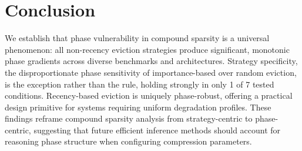 \documentclass[11pt,a4paper]{article}
\begin{document}
\section{Conclusion}

We establish that phase vulnerability in compound sparsity is a universal phenomenon: all non-recency eviction strategies produce significant, monotonic phase gradients across diverse benchmarks and architectures. Strategy specificity, the disproportionate phase sensitivity of importance-based over random eviction, is the exception rather than the rule, holding strongly in only 1 of 7 tested conditions. Recency-based eviction is uniquely phase-robust, offering a practical design primitive for systems requiring uniform degradation profiles. These findings reframe compound sparsity analysis from strategy-centric to phase-centric, suggesting that future efficient inference methods should account for reasoning phase structure when configuring compression parameters.



\end{document}
